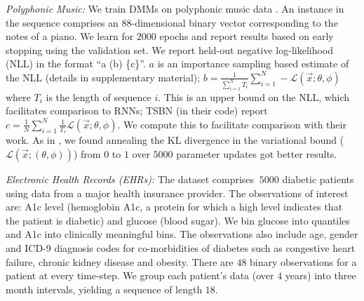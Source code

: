\documentclass[letterpaper]{article}
\newcommand{\vecx}{\vec{x}}
\newcommand{\lthph}{\mathcal{L}(\vecx;(\theta, \phi))}
\theoremstyle{plain}
\newcommand{\citep}{\cite}
\begin{document}
\textit{Polyphonic Music: }
We train DMMs on polyphonic music data \cite{boulanger2012modeling}. 
An instance in the sequence comprises 
an 88-dimensional binary vector corresponding to the notes of a piano. 
We learn for $2000$ epochs and report results based on early stopping using the validation set. 
We report held-out negative log-likelihood (NLL) in the format ``a (b) \{c\}''.
$a$ is an importance sampling based estimate of the
NLL (details in supplementary material);
$b = \frac{1}{\sum_{i=1}^N T_i}\sum_{i=1}^N -\mathcal{L}(\vecx;\theta, \phi)$ where $T_i$ is the length
of sequence $i$. This is an upper bound on the NLL, which facilitates comparison
to RNNs;
TSBN \cite{gan2015deep} (in their code) report 
$c = \frac{1}{N}\sum_{i=1}^N \frac{1}{T_i} \mathcal{L}(\vecx;\theta, \phi)$. We compute this 
to facilitate comparison with their work.
As in \citep{howtotrain}, we found 
annealing the KL divergence in the variational bound ($\lthph$) from $0$ to $1$ over
$5000$ parameter updates got better results. 

\textit{Electronic Health Records (EHRs): } 
The dataset comprises $~5000$ diabetic patients using data from a major health insurance provider. 
The observations of interest are: A1c level (hemoglobin A1c, a protein
for which a high level indicates that the patient is diabetic) and glucose (blood sugar).
We bin glucose into quantiles and A1c into clinically meaningful bins. The observations also include age, gender and ICD-9 
diagnosis codes for co-morbidities of diabetes such as congestive heart failure, chronic kidney disease and obesity. 
There are $48$ binary observations for a patient at every time-step. 
We group each patient's data (over $4$ years) into three month intervals, yielding a sequence of length $18$. 
\end{document}
